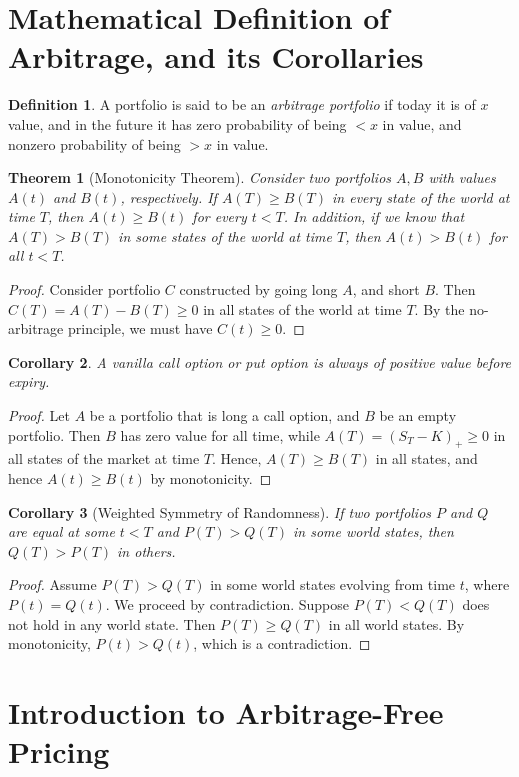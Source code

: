 \documentclass[12pt]{amsbook}
\theoremstyle{plain}
\newtheorem{theorem}{Theorem}
\newtheorem{corollary}[theorem]{Corollary}
\theoremstyle{definition}
\newtheorem*{definition}{Definition}
\theoremstyle{remark}
\numberwithin{equation}{section}  %
\begin{document}
	\section{Mathematical Definition of Arbitrage, and its Corollaries}
	\begin{definition}
		A portfolio is said to be an \emph{arbitrage portfolio} if today it is
		of $x$ value, and in the future it has zero probability of being $<x$ in 
		value,
		and nonzero probability of being $>x$ in value. 
	\end{definition}
	\begin{theorem}[Monotonicity Theorem]
		Consider two portfolios $A, B$ with values $A(t)$ and $B(t)$, respectively. 
		If $A(T) \ge B(T)$ in every state of the world at time $T$, then
		$A(t) \ge B(t)$ for every $t < T$. In addition, if we know that
		$A(T) > B(T)$ in some states of the world at time $T$, then
		$A(t) > B(t)$ for all $t < T$. 
	\end{theorem}
	\begin{proof}
		Consider portfolio $C$ constructed by going long $A$, and short $B$. Then
		$C(T) = A(T) - B(T) \ge 0$ in all states of the world at time $T$. 
		By the no-arbitrage principle, we must have $C(t) \ge 0$. \qedhere
	\end{proof}
	\begin{corollary}
		A vanilla call option or put option is always of positive value before 
		expiry.
	\end{corollary}
	\begin{proof}
		Let $A$ be a portfolio that is long a call option, and $B$ be an empty
		portfolio.  Then $B$ has zero value for all time, while $A(T) = {(S_{T}
	- K)}_{+} \ge 0$ in all states of the market at time $T$. Hence, $A(T) \ge
	B(T)$ in all states, and hence $A(t) \ge B(t)$ by monotonicity.
\end{proof}
\begin{corollary}[Weighted Symmetry of Randomness]
	If two portfolios $P$ and $Q$ are equal at some $t < T$ and $P(T) > Q(T)$
	in some world states, then $Q(T) > P(T)$ in others. 
\end{corollary}
\begin{proof}
	Assume $P(T) > Q(T)$ in some world states evolving from time $t$, where
	$P(t) = Q(t)$. We proceed by contradiction. Suppose $P(T) < Q(T)$ does not 
	hold
	in any world state. Then $P(T) \ge Q(T)$ in all world states. By 
	monotonicity,
	$P(t) > Q(t)$, which is a contradiction.
\end{proof}
\section{Introduction to Arbitrage-Free Pricing}
\end{document}
